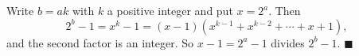 Write $b=ak$ with $k$ a positive integer and put $x=2^a$. Then
\[2^b-1=x^k-1=(x-1)\left(x^{k-1}+x^{k-2}+\cdots+x+1\right),\]
and the second factor is an integer. So $x-1=2^a-1$ divides $2^b-1$. $\blacksquare$
